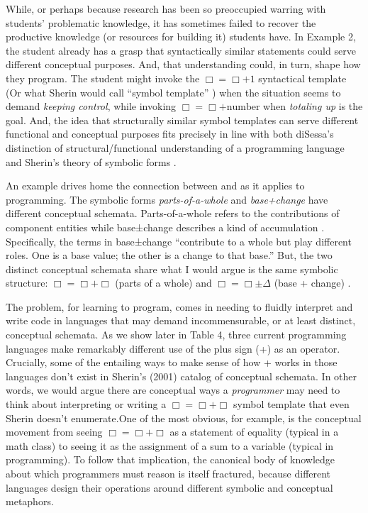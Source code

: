 While, or perhaps because
research has been so preoccupied warring with students' problematic
knowledge, it has sometimes failed to recover the productive knowledge
(or resources for building it) students have. In Example 2, the
student already has a grasp that syntactically similar statements could
serve different conceptual purposes. And, that understanding could, in turn, shape how they program. The student might
invoke the $\Box=︎ \Box + 1$ syntactical
template (Or what Sherin would call ``symbol template'' \cite{sherin_how_2001}) when the situation seems to demand \emph{keeping control},
while invoking $\Box= ︎\Box + \mathrm{number}$ when \emph{totaling up} is the goal.
And, the idea that structurally similar symbol templates can serve
different functional and conceptual purposes fits precisely in line with both diSessa's distinction of structural/functional understanding of a programming language \cite{disessa_models_1986} and
Sherin's theory of symbolic forms \cite{sherin_how_2001}.

An example drives home the connection between \cite{disessa_models_1986} and \cite{sherin_how_2001} as it applies to programming. The symbolic
forms \emph{parts-of-a-whole} and \emph{base+change} have different
conceptual schemata. Parts-of-a-whole refers to the contributions of
component entities while base±change describes a kind of accumulation \cite{sherin_how_2001}.
Specifically, the terms in base±change ``contribute to a whole but play different roles. One is a base value; the other is a change to that base.'' But, the two distinct conceptual schemata share what I
would argue is the same symbolic structure: $\Box=︎ \Box + \Box$ (parts of a whole) and $\Box = \Box \pm \Delta$ (base + change) \cite{sherin_how_2001}.

The problem, for learning to program, comes in needing to fluidly
interpret and write code in languages that may demand incommensurable,
or at least distinct, conceptual schemata. As we show later in Table 4,
three current programming languages make remarkably different use of the
plus sign (+) as an operator. Crucially, some of the entailing ways to
make sense of how + works in those languages don't exist in Sherin's
(2001) catalog of conceptual schemata. In other words, we would argue
there are conceptual ways a \emph{programmer} may need to think about
interpreting or writing a $\Box=︎ \Box +\Box$ symbol template that even Sherin \cite{sherin_how_2001} doesn't
enumerate.One of the most obvious, for example, is the conceptual movement from seeing
  $\Box=︎ \Box +\Box$ as a statement of equality (typical in a math class) to seeing it as the assignment of a
  sum to a variable (typical in programming). To follow that implication, the canonical body of
knowledge about which programmers must reason is itself fractured,
because different languages design their operations around different
symbolic and conceptual metaphors.

